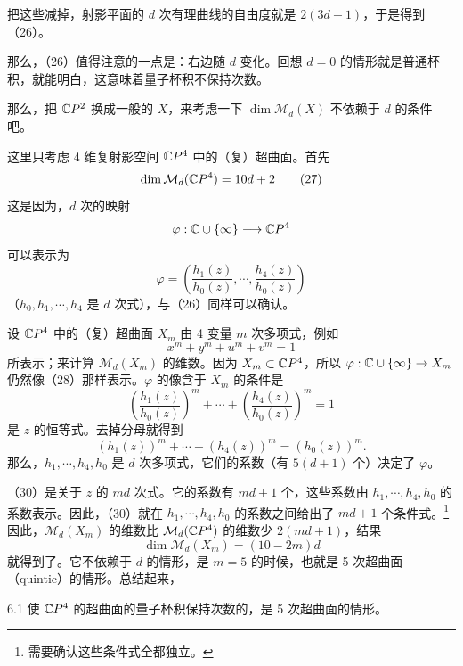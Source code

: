 把这些减掉，射影平面的 $d$ 次有理曲线的自由度就是 $2(3d-1)$，于是得到（26）。

那么，（26）值得注意的一点是：右边随 $d$ 变化。回想 $d=0$ 的情形就是普通杯积，就能明白，这意味着量子杯积不保持次数。

那么，把 $\mathbb{C}P^2$ 换成一般的 $X$，来考虑一下 $\dim \mathcal{M}_d(X)$ 不依赖于 $d$
的条件吧。

这里只考虑 4 维复射影空间 $\mathbb{C}P^4$ 中的（复）超曲面。首先
\begin{equation}
\dim \mathcal{M}_d(\mathbb{C}P^4) = 10d+2 \tag{27}
\end{equation}
这是因为，$d$ 次的映射
\[
\varphi : \mathbb{C}\cup\{\infty\} \longrightarrow \mathbb{C}P^4
\]
可以表示为
\begin{equation}
\varphi = \left(\frac{h_1(z)}{h_0(z)},\cdots,\frac{h_4(z)}{h_0(z)}\right) \tag{28}
\end{equation}
（$h_0,h_1,\cdots,h_4$ 是 $d$ 次式），与（26）同样可以确认。

设 $\mathbb{C}P^4$ 中的（复）超曲面 $X_m$ 由 4 变量 $m$ 次多项式，例如
\begin{equation}
x^m + y^m + u^m + v^m = 1 \tag{29}
\end{equation}
所表示；来计算 $\mathcal{M}_d(X_m)$ 的维数。因为 $X_m\subset\mathbb{C}P^4$，所以 $\varphi:\mathbb{C}\cup\{\infty\}\to X_m$ 仍然像（28）那样表示。$\varphi$ 的像含于 $X_m$ 的条件是
\[
\left(\frac{h_1(z)}{h_0(z)}\right)^m + \cdots + \left(\frac{h_4(z)}{h_0(z)}\right)^m = 1
\]
是 $z$ 的恒等式。去掉分母就得到
\begin{equation}
(h_1(z))^m + \cdots + (h_4(z))^m = (h_0(z))^m. \tag{30}
\end{equation}
那么，$h_1,\cdots,h_4,h_0$ 是 $d$ 次多项式，它们的系数（有 $5(d+1)$ 个）决定了 $\varphi$。

（30）是关于 $z$ 的 $md$ 次式。它的系数有 $md+1$ 个，这些系数由 $h_1,\cdots,h_4,h_0$ 的系数表示。因此，（30）就在 $h_1,\cdots,h_4,h_0$ 的系数之间给出了 $md+1$ 个条件式。\footnote{需要确认这些条件式全都独立。}
因此，$\mathcal{M}_d(X_m)$ 的维数比 $\mathcal{M}_d(\mathbb{C}P^4)$ 的维数少 $2(md+1)$，结果
\[
\dim \mathcal{M}_d(X_m) = (10-2m)d
\]
就得到了。它不依赖于 $d$ 的情形，是 $m=5$ 的时候，也就是 5 次超曲面（quintic）的情形。总结起来，

\begin{theorem*}{6.1}
使 $\mathbb{C}P^4$ 的超曲面的量子杯积保持次数的，是 5 次超曲面的情形。
\end{theorem*}

